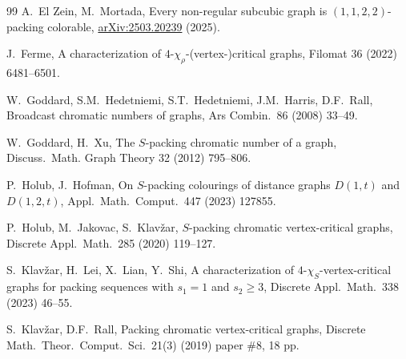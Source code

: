 \documentclass[12pt]{article}
\begin{document}
\begin{thebibliography}{99}
A.~El Zein, M.~Mortada,
Every non-regular subcubic graph is $(1,1,2,2)$-packing colorable,
\url{arXiv:2503.20239} (2025).

J.~Ferme,
A characterization of $4$-$\chi_\rho$-(vertex-)critical graphs,
Filomat 36 (2022) 6481--6501.


W.~Goddard, S.M.~Hedetniemi, S.T.~Hedetniemi, J.M.~Harris, D.F.~Rall, 
Broadcast chromatic numbers of graphs, 
Ars Combin.\ 86 (2008) 33--49. 

W.~Goddard, H.~Xu,
The $S$-packing chromatic number of a graph,
Discuss.\ Math. Graph Theory 32 (2012) 795--806.





P.~Holub, J.~Hofman, 
On $S$-packing colourings of distance graphs $D(1,t)$ and $D(1,2,t)$,
Appl.\ Math.\ Comput.\ 447 (2023) 127855.

P.~Holub, M.~Jakovac, S.~Klav\v{z}ar,
$S$-packing chromatic vertex-critical graphs,
Discrete Appl.\ Math.\ 285 (2020) 119--127.


S.~Klav\v{z}ar, H.~Lei, X.~Lian, Y.~Shi,
A characterization of $4$-$\chi_S$-vertex-critical graphs for packing sequences with $s_1=1$ and $s_2\geq 3$,
Discrete Appl.\ Math.\ 338 (2023) 46--55.

S.~Klav\v{z}ar, D.F.~Rall,
Packing chromatic vertex-critical graphs,
Discrete Math.\ Theor.\ Comput.\ Sci.\  21(3) (2019) paper \#8, 18 pp.


\end{thebibliography}
\end{document}
